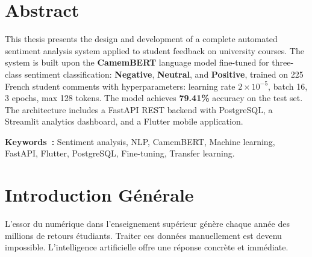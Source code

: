 \documentclass[12pt,a4paper,oneside]{report}
\begin{document}
\chapter*{Abstract}
\begin{tcolorbox}[enhanced,colback=vertprincipal!5!white,colframe=vertprincipal,
  boxrule=1.5pt,arc=6pt,left=10pt,right=10pt,top=8pt,bottom=8pt]
This thesis presents the design and development of a complete automated
sentiment analysis system applied to student feedback on university courses.
The system is built upon the \textbf{CamemBERT} language model fine-tuned
for three-class sentiment classification: \textbf{Negative}, \textbf{Neutral},
and \textbf{Positive}, trained on 225 French student comments with
hyperparameters: learning rate $2\times10^{-5}$, batch 16, 3 epochs,
max 128 tokens. The model achieves \textbf{79.41\%} accuracy on the test set.
The architecture includes a FastAPI REST backend with PostgreSQL, a Streamlit
analytics dashboard, and a Flutter mobile application.
\end{tcolorbox}
\vspace{0.5em}
\noindent\textbf{Keywords~:} Sentiment analysis, NLP, CamemBERT, Machine
learning, FastAPI, Flutter, PostgreSQL, Fine-tuning, Transfer learning.
\cleardoublepage

{\hypersetup{linkcolor=black}
\tableofcontents\cleardoublepage
\listoffigures\cleardoublepage
\listoftables\cleardoublepage}
\printglossary[type=\acronymtype,title={Liste des Acronymes}]
\cleardoublepage

\setcounter{page}{1}

\chapter*{Introduction Générale}

\begin{infobox}
L'essor du numérique dans l'enseignement supérieur génère chaque année
des millions de retours étudiants. Traiter ces données manuellement est
devenu impossible. L'intelligence artificielle offre une réponse concrète
et immédiate.
\end{infobox}
\end{document}
